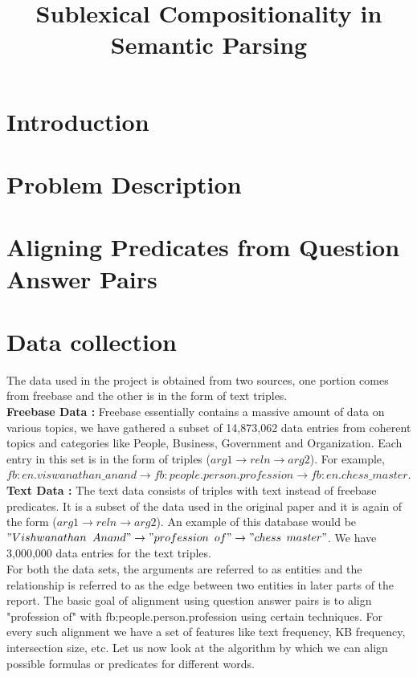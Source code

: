 \documentclass[12pt, a4paper]{article}
\title{Sublexical Compositionality in Semantic Parsing}
\begin{document}
\maketitle

\section{Introduction}

\section{Problem Description}

\section{Aligning Predicates from Question Answer Pairs}



\section{Data collection}
The data used in the project is obtained from two sources, one portion comes from freebase and the other is in the form of text triples.\\

{\bf Freebase Data : }Freebase essentially contains a massive amount of data on various topics, we have gathered a subset of 14,873,062 data entries from coherent topics and categories like People, Business, Government and Organization. Each entry in this set is in the form of triples ($arg1\rightarrow reln \rightarrow arg2$). For example, $fb:en.viswanathan\_anand \rightarrow	fb:people.person.profession \rightarrow	fb:en.chess\_master$. \\

{\bf Text Data : }The text data consists of triples with text instead of freebase predicates. It is a subset of the data used in the original paper and it is again of the form ($arg1\rightarrow reln \rightarrow arg2$). An example of this database would be $"Vishwanathan$ $Anand" \rightarrow "profession$ $of" \rightarrow "chess$ $master"$. We have 3,000,000 data entries for the text triples.\\

For both the data sets, the arguments are referred to as entities and the relationship is referred to as the edge between two entities in later parts of the report. The basic goal of alignment using question answer pairs is to align "profession of" with fb:people.person.profession using certain techniques. For every such alignment we have a set of features like text frequency, KB frequency, intersection size, etc.
Let us now look at the algorithm by which we can align possible formulas or predicates for different words.
\end{document}
